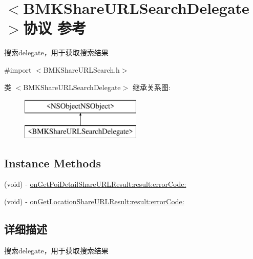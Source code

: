 \hypertarget{protocol_b_m_k_share_u_r_l_search_delegate-p}{\section{$<$B\+M\+K\+Share\+U\+R\+L\+Search\+Delegate$>$协议 参考}
\label{protocol_b_m_k_share_u_r_l_search_delegate-p}
}


搜索delegate，用于获取搜索结果  




{\ttfamily \#import $<$B\+M\+K\+Share\+U\+R\+L\+Search.\+h$>$}

类 $<$B\+M\+K\+Share\+U\+R\+L\+Search\+Delegate$>$ 继承关系图\+:\begin{figure}[H]
\begin{center}
\leavevmode
\includegraphics[height=2.000000cm]{protocol_b_m_k_share_u_r_l_search_delegate-p}
\end{center}
\end{figure}
\subsection*{Instance Methods}
\begin{DoxyCompactItemize}
\item 
(void) -\/ \hyperlink{protocol_b_m_k_share_u_r_l_search_delegate-p_a585f4e1aa26bb11f59bd624c0e513cd6}{on\+Get\+Poi\+Detail\+Share\+U\+R\+L\+Result\+:result\+:error\+Code\+:}
\item 
(void) -\/ \hyperlink{protocol_b_m_k_share_u_r_l_search_delegate-p_a856efc4ec1a61f942bd5c025f29fc83c}{on\+Get\+Location\+Share\+U\+R\+L\+Result\+:result\+:error\+Code\+:}
\end{DoxyCompactItemize}


\subsection{详细描述}
搜索delegate，用于获取搜索结果 

